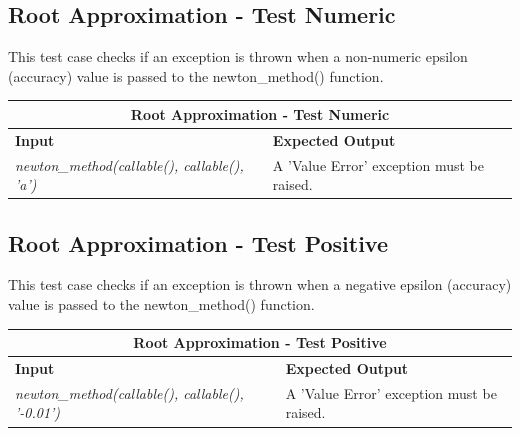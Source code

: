 \vspace*{1em}

\subsection{Root Approximation - Test Numeric}
\begin{flushleft}
    This test case checks if an exception is thrown when a non-numeric epsilon (accuracy) value is passed to the newton\_method() function.
\vspace*{1em}

\begin{tabular}{ |p{6cm}||p{6cm} |  }
    \hline
    \multicolumn{2}{|c|}{\textbf{Root Approximation - Test Numeric}} \\
    \hline
    \textbf{Input} & \textbf{Expected Output}\\
    \hline
    \textit{newton\_method(callable(), callable(), 'a')}   & A 'Value Error' exception must be raised. \\
    \hline
\end{tabular}
\end{flushleft}

\vspace*{1em}

\subsection{Root Approximation - Test Positive}
\begin{flushleft}
    This test case checks if an exception is thrown when a negative epsilon (accuracy) value is passed to the newton\_method() function.
\vspace*{1em}

\begin{tabular}{ |p{6cm}||p{6cm} |  }
    \hline
    \multicolumn{2}{|c|}{\textbf{Root Approximation - Test Positive}} \\
    \hline
    \textbf{Input} & \textbf{Expected Output}\\
    \hline
    \textit{newton\_method(callable(), callable(), '-0.01')}   & A 'Value Error' exception must be raised. \\
    \hline
\end{tabular}
\end{flushleft}

\vspace*{1em}

